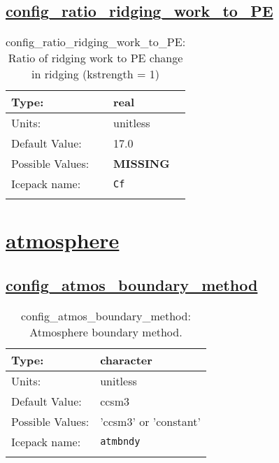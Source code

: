 \subsection[config\_ratio\_ridging\_work\_to\_PE]{\hyperref[sec:nm_tab_ridging]{config\_ratio\_ridging\_work\_to\_PE}}
\label{subsec:nm_sec_config_ratio_ridging_work_to_PE}
\begin{center}
\begin{longtable}{| p{2.0in} || p{4.0in} |}
    \hline
    Type: & real \\
    \hline
    Units: & \si{unitless} \\
    \hline
    Default Value: & 17.0 \\
    \hline
    Possible Values: & {\bf \color{red} MISSING} \\
    \hline
    \hline
    Icepack name: & \verb+Cf+ \\
    \caption{config\_ratio\_ridging\_work\_to\_PE: Ratio of ridging work to PE change in ridging (kstrength = 1)}
\end{longtable}
\end{center}
\section[atmosphere]{\hyperref[sec:nm_tab_atmosphere]{atmosphere}}
\label{sec:nm_sec_atmosphere}
\subsection[config\_atmos\_boundary\_method]{\hyperref[sec:nm_tab_atmosphere]{config\_atmos\_boundary\_method}}
\label{subsec:nm_sec_config_atmos_boundary_method}
\begin{center}
\begin{longtable}{| p{2.0in} || p{4.0in} |}
    \hline
    Type: & character \\
    \hline
    Units: & \si{unitless} \\
    \hline
    Default Value: & ccsm3 \\
    \hline
    Possible Values: & 'ccsm3' or 'constant' \\
    \hline
    \hline
    Icepack name: & \verb+atmbndy+ \\
    \caption{config\_atmos\_boundary\_method: Atmosphere boundary method.}
\end{longtable}
\end{center}
